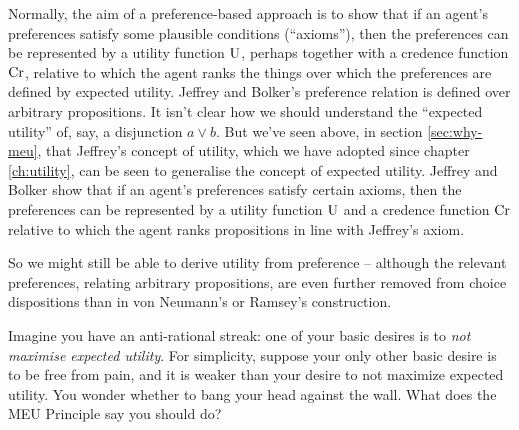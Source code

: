 Normally, the aim of a preference-based approach is to show that if an agent's
preferences satisfy some plausible conditions (``axioms''), then the preferences
can be represented by a utility function $\text{U}$, perhaps together with a credence
function $\text{Cr}$, relative to which the agent ranks the things over which the
preferences are defined by expected utility. Jeffrey and Bolker's preference
relation is defined over arbitrary propositions. It isn't clear how we should
understand the ``expected utility'' of, say, a disjunction $a \lor b$. But we've
seen above, in section \ref{sec:why-meu}, that Jeffrey's concept of utility,
which we have adopted since chapter \ref{ch:utility}, can be seen to generalise
the concept of expected utility. Jeffrey and Bolker show that if an agent's
preferences satisfy certain axioms, then the preferences can be represented by a
utility function $\text{U}$ and a credence function $\text{Cr}$ relative to which the agent
ranks propositions in line with Jeffrey's axiom.

So we might still be able to derive utility from preference -- although the
relevant preferences, relating arbitrary propositions, are even further removed
from choice dispositions than in von Neumann's or Ramsey's construction.

\begin{exercise}{3}
  Imagine you have an anti-rational streak: one of your basic desires is to
  \emph{not maximise expected utility}. For simplicity, suppose your only other
  basic desire is to be free from pain, and it is weaker than your desire to not
  maximize expected utility. You wonder whether to bang your head against the
  wall. What does the MEU Principle say you should do?
\end{exercise}

  
  

